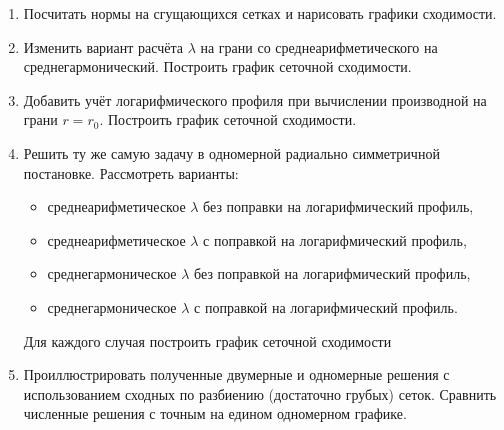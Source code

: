 \begin{enumerate}
\item Посчитать нормы на сгущающихся сетках и нарисовать графики сходимости.
\item Изменить вариант расчёта $\lambda$ на грани со среднеарифметического на среднегармонический. Построить график сеточной сходимости.
\item Добавить учёт логарифмического профиля при вычислении производной на грани $r=r_0$. Построить график сеточной сходимости.
\item Решить ту же самую задачу в одномерной радиально симметричной постановке.
      Рассмотреть варианты:
      \begin{itemize}
      \item среднеарифметическое $\lambda$ без поправки на логарифмический профиль,
      \item среднеарифметическое $\lambda$ с поправкой на логарифмический профиль,
      \item среднегармоническое $\lambda$ без поправкой на логарифмический профиль,
      \item среднегармоническое $\lambda$ с поправкой на логарифмический профиль.
      \end{itemize}
      Для каждого случая построить график сеточной сходимости
\item Проиллюстрировать полученные двумерные и одномерные решения с использованием сходных по разбиению
      (достаточно грубых) сеток.
      Сравнить численные решения с точным на едином одномерном графике.
\end{enumerate}

